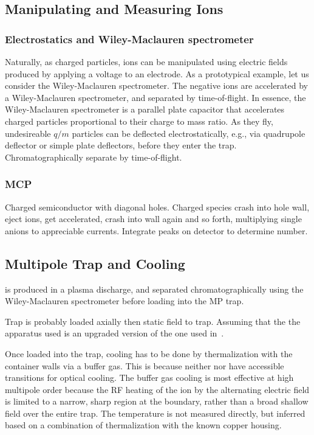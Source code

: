 \documentclass[12pt]{article}
\begin{document}
\subsection{Manipulating and Measuring Ions}
\subsubsection{Electrostatics and Wiley-Maclauren spectrometer}
Naturally, as charged particles, ions can be manipulated using electric fields produced by applying a voltage to an electrode. As a prototypical example, let us consider  the Wiley-Maclauren spectrometer. 
The negative ions are accelerated by a Wiley-Maclauren spectrometer, and separated by time-of-flight. In essence, the Wiley-Maclauren spectrometer is a parallel plate capacitor that accelerates charged particles proportional to their charge to mass ratio. As they fly, undesireable \( q/m \) particles can be deflected electrostatically, e.g., via quadrupole deflector or simple plate deflectors, before they enter the trap. Chromatographically separate by time-of-flight.

\subsubsection{MCP}
Charged semiconductor with diagonal holes. Charged species crash into hole wall, eject ions, get accelerated, crash into wall again and so forth, multiplying single anions to appreciable currents. Integrate peaks on detector to determine number.

\subsection{Multipole Trap and Cooling}
 is produced in a plasma discharge, and separated chromatographically using the Wiley-Maclauren spectrometer before loading into the MP trap.

Trap is probably loaded axially then static field to trap. Assuming that the the apparatus used is an upgraded version of the one used in~\cite{mikosch_evaporation_2008}.

Once loaded into the trap, cooling has to be done by thermalization with the container walls via a buffer gas. This is because neither  nor  have accessible transitions for optical cooling. The buffer gas cooling is most effective at high multipole order because the RF heating of the ion by the alternating electric field is limited to a narrow, sharp region at the boundary, rather than a broad shallow field over the entire trap. The temperature is not measured directly, but inferred based on a combination of thermalization with the known copper housing.
\end{document}
